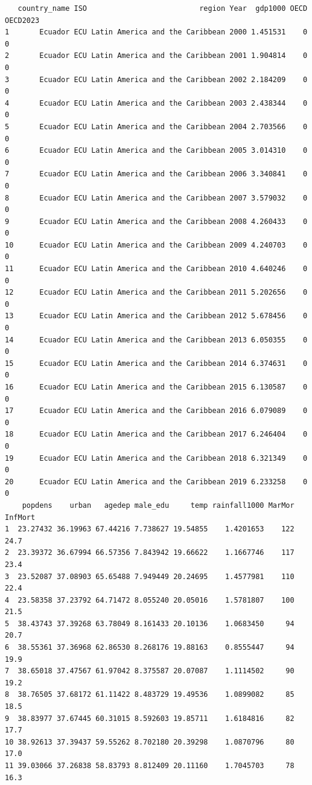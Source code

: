 \documentclass[
  letterpaper,
  DIV=11,
  numbers=noendperiod]{scrartcl}
\begin{document}
\begin{verbatim}
   country_name ISO                          region Year  gdp1000 OECD OECD2023
1       Ecuador ECU Latin America and the Caribbean 2000 1.451531    0        0
2       Ecuador ECU Latin America and the Caribbean 2001 1.904814    0        0
3       Ecuador ECU Latin America and the Caribbean 2002 2.184209    0        0
4       Ecuador ECU Latin America and the Caribbean 2003 2.438344    0        0
5       Ecuador ECU Latin America and the Caribbean 2004 2.703566    0        0
6       Ecuador ECU Latin America and the Caribbean 2005 3.014310    0        0
7       Ecuador ECU Latin America and the Caribbean 2006 3.340841    0        0
8       Ecuador ECU Latin America and the Caribbean 2007 3.579032    0        0
9       Ecuador ECU Latin America and the Caribbean 2008 4.260433    0        0
10      Ecuador ECU Latin America and the Caribbean 2009 4.240703    0        0
11      Ecuador ECU Latin America and the Caribbean 2010 4.640246    0        0
12      Ecuador ECU Latin America and the Caribbean 2011 5.202656    0        0
13      Ecuador ECU Latin America and the Caribbean 2012 5.678456    0        0
14      Ecuador ECU Latin America and the Caribbean 2013 6.050355    0        0
15      Ecuador ECU Latin America and the Caribbean 2014 6.374631    0        0
16      Ecuador ECU Latin America and the Caribbean 2015 6.130587    0        0
17      Ecuador ECU Latin America and the Caribbean 2016 6.079089    0        0
18      Ecuador ECU Latin America and the Caribbean 2017 6.246404    0        0
19      Ecuador ECU Latin America and the Caribbean 2018 6.321349    0        0
20      Ecuador ECU Latin America and the Caribbean 2019 6.233258    0        0
    popdens    urban   agedep male_edu     temp rainfall1000 MarMor InfMort
1  23.27432 36.19963 67.44216 7.738627 19.54855    1.4201653    122    24.7
2  23.39372 36.67994 66.57356 7.843942 19.66622    1.1667746    117    23.4
3  23.52087 37.08903 65.65488 7.949449 20.24695    1.4577981    110    22.4
4  23.58358 37.23792 64.71472 8.055240 20.05016    1.5781807    100    21.5
5  38.43743 37.39268 63.78049 8.161433 20.10136    1.0683450     94    20.7
6  38.55361 37.36968 62.86530 8.268176 19.88163    0.8555447     94    19.9
7  38.65018 37.47567 61.97042 8.375587 20.07087    1.1114502     90    19.2
8  38.76505 37.68172 61.11422 8.483729 19.49536    1.0899082     85    18.5
9  38.83977 37.67445 60.31015 8.592603 19.85711    1.6184816     82    17.7
10 38.92613 37.39437 59.55262 8.702180 20.39298    1.0870796     80    17.0
11 39.03066 37.26838 58.83793 8.812409 20.11160    1.7045703     78    16.3

\end{verbatim}
\end{document}
